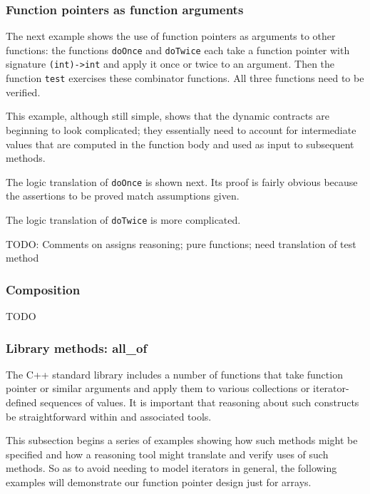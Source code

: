{\subsubsection{Function pointers as function arguments}
The next example shows the use of function pointers as arguments to other functions: the functions \lstinline|doOnce|
and \lstinline|doTwice| each take a function pointer with signature \lstinline|(int)->int| and apply it once or twice to an
argument. Then the function \lstinline|test| exercises these combinator functions. All three functions need to be verified.



This example, although still simple, shows that the dynamic contracts
are beginning to look complicated; they essentially need to account
for intermediate values that are computed in the function body and used as input to subsequent methods.


 
The logic translation of \lstinline|doOnce| is shown next. Its proof is fairly obvious because the assertions to be proved match 
assumptions given.



The logic translation of \lstinline|doTwice| is more complicated.



TODO: Comments on assigns reasoning; pure functions; need translation of test method

\subsubsection{Composition}

TODO

\subsubsection{Library methods: all\_of}
\label{sec:libraryMethods}
The C++ standard library includes a number of functions that take function pointer or similar arguments and apply them to various 
collections or iterator-defined sequences of values. 
It is important
that reasoning about such constructs be straightforward within \NAME and
associated tools. 

This subsection begins a series of examples showing how such methods might be 
specified and how a reasoning tool might translate and verify uses of such methods. So as to avoid needing to model iterators in general, the 
following examples will demonstrate our function pointer design just
for arrays.

}
